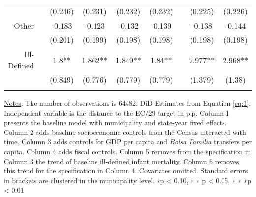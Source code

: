 \begin{table}[h!]
\begin{footnotesize}
\begin{center}
{\begin{threeparttable}[b]
\begin{tabular}{rrccccccc}
          &       & (0.246) & (0.231) & (0.232) & (0.232) &       & (0.225) & (0.226) \\
    \multicolumn{1}{p{15.145em}}{Other} &       & -0.183 & -0.123 & -0.132 & -0.139 &       & -0.138 & -0.144 \\
          &       & (0.201) & (0.199) & (0.198) & (0.198) &       & (0.198) & (0.198) \\
    \multicolumn{1}{p{15.145em}}{Ill-Defined} &       & 1.8** & 1.862** & 1.849** & 1.84** &       & 2.977** & 2.968** \\
          &       & (0.849) & (0.776) & (0.779) & (0.779) &       & (1.379) & (1.38) \\
          &       &       &       &       &       &       &       &  \\
    \bottomrule
    \bottomrule
    \end{tabular}%
    
    
    \begin{tablenotes}
  \scriptsize{\underline{Notes}: The number of observations is 64482. DiD Estimates from Equation \ref{eq:1}. Independent variable is the distance to the EC/29 target in p.p. Column 1 presents the baseline model with municipality and state-year fixed effects. Column 2 adds baseline socioeconomic controls from the Census interacted with time. Column 3 adds controls for GDP per capita and \emph{Bolsa Familia} transfers per capita. Column 4 adds fiscal controls. Column 5 removes from the specification in Column 3 the trend of baseline ill-defined infant mortality. Column 6 removes this trend for the specification in Column 4. Covariates omitted. Standard errors in brackets are clustered in the municipality level. ∗p < 0.10, ∗ ∗ p < 0.05, ∗ ∗ ∗p < 0.01}
  \end{tablenotes}
    
    
  \label{table:app_imr}%

\end{threeparttable}
}
\end{center}
\end{footnotesize}
\end{table}